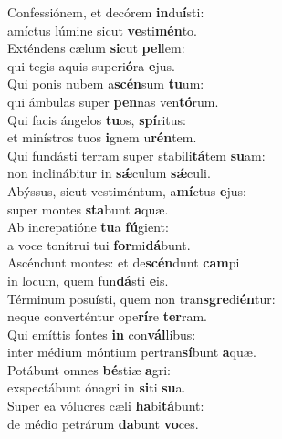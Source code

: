 \evenverse Confessiónem, et decórem \textbf{in}du\textbf{í}sti:~\*\\
\evenverse amíctus lúmine sicut \textbf{ve}sti\textbf{mén}to.\\
\oddverse Exténdens cælum \textbf{si}cut \textbf{pel}lem:~\*\\
\oddverse qui tegis aquis superi\textbf{ó}ra \textbf{e}jus.\\
\evenverse Qui ponis nubem a\textbf{scén}sum \textbf{tu}um:~\*\\
\evenverse qui ámbulas super \textbf{pen}nas ven\textbf{tó}rum.\\
\oddverse Qui facis ángelos \textbf{tu}os, \textbf{spí}ritus:~\*\\
\oddverse et minístros tuos \textbf{i}gnem u\textbf{rén}tem.\\
\evenverse Qui fundásti terram super stabili\textbf{tá}tem \textbf{su}am:~\*\\
\evenverse non inclinábitur in \textbf{sǽ}culum \textbf{sǽ}culi.\\
\oddverse Abýssus, sicut vestiméntum, a\textbf{mí}ctus \textbf{e}jus:~\*\\
\oddverse super montes \textbf{sta}bunt \textbf{a}quæ.\\
\evenverse Ab increpatióne \textbf{tu}a \textbf{fú}gient:~\*\\
\evenverse a voce tonítrui tui \textbf{for}mi\textbf{dá}bunt.\\
\oddverse Ascéndunt montes: et de\textbf{scén}dunt \textbf{cam}pi~\*\\
\oddverse in locum, quem fun\textbf{dá}sti \textbf{e}is.\\
\evenverse Términum posuísti, quem non tran\textbf{sgre}di\textbf{én}tur:~\*\\
\evenverse neque converténtur ope\textbf{rí}re \textbf{ter}ram.\\
\oddverse Qui emíttis fontes \textbf{in} con\textbf{vál}libus:~\*\\
\oddverse inter médium móntium pertran\textbf{sí}bunt \textbf{a}quæ.\\
\evenverse Potábunt omnes \textbf{bé}stiæ \textbf{a}gri:~\*\\
\evenverse exspectábunt ónagri in \textbf{si}ti \textbf{su}a.\\
\oddverse Super ea vólucres cæli \textbf{ha}bi\textbf{tá}bunt:~\*\\
\oddverse de médio petrárum \textbf{da}bunt \textbf{vo}ces.\\

